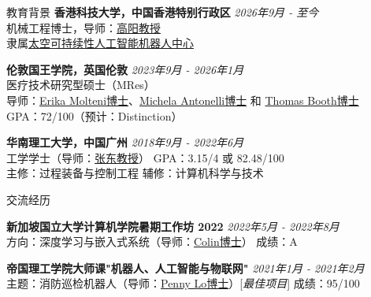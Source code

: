 \documentclass{resume} %
\begin{document}

\begin{rSection}{教育背景}
{\bf 香港科技大学，中国香港特别行政区} \hfill {\em 2026年9月 - 至今} 
\\ 机械工程博士，导师：{\href{https://yanggao.people.ust.hk/index.html}{高阳教授}}
\\ 隶属{\href{https://yanggao.people.ust.hk/CAIRSS.html}{太空可持续性人工智能机器人中心}}

{\bf 伦敦国王学院，英国伦敦} \hfill {\em 2023年9月 - 2026年1月} 
\\ 医疗技术研究型硕士（MRes）
\\ 导师：{\href{https://profiles.ucl.ac.uk/60656-erika-molteni/about}{Erika Molteni博士}}、{\href{https://www.kcl.ac.uk/people/michela-antonelli}{Michela Antonelli博士}} 和 {\href{https://www.kcl.ac.uk/people/thomas-booth}{Thomas Booth博士}} 
\\ GPA：72/100（预计：Distinction）

{\bf 华南理工大学，中国广州} \hfill {\em 2018年9月 - 2022年6月} 
\\ 工学学士（导师：{\href{https://www2.scut.edu.cn/ft_en/2025/1021/c45325a606216/page.htm}{张东教授}}） \hfill GPA：3.15/4 或 82.48/100
\\ 主修：过程装备与控制工程 \hfill 辅修：计算机科学与技术

\end{rSection}


\begin{rSection}{交流经历}

{\bf 新加坡国立大学计算机学院暑期工作坊 2022} \hfill {\em 2022年5月 - 2022年8月}\\
方向：深度学习与嵌入式系统（导师：{\href{https://www.comp.nus.edu.sg/cs/people/ctank/}{Colin博士}}） \hfill 成绩：A

{\bf 帝国理工学院大师课"机器人、人工智能与物联网"} \hfill{\em 2021年1月 - 2021年2月}
\\ 主题：消防巡检机器人（导师：{\href{https://www.imperial.ac.uk/people/benny.lo}{Penny Lo博士}}）[{\em 最佳项目}] \hfill 成绩：95/100

\end{rSection}
\end{document}
